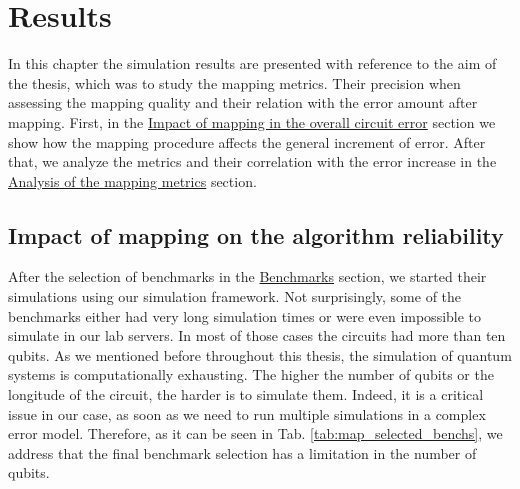 
\chapter{Results}
\label{sec:org82a161d}

In this chapter the simulation results are presented with reference to the aim of the thesis, which was to study the mapping metrics.
Their precision when assessing the mapping quality and their relation with the error amount after mapping.
First, in the \hyperref[sec:org28dbcca]{Impact of mapping in the overall circuit error} section we show how the mapping procedure affects the general increment of error.
After that, we analyze the metrics and their correlation with the error increase in the \hyperref[sec:org2c64a48]{Analysis of the mapping metrics} section.

\section{Impact of mapping on the algorithm reliability}
\label{sec:org28dbcca}
After the selection of benchmarks in the \href{chapter-4.org}{Benchmarks} section, we started their simulations using our simulation framework.
Not surprisingly, some of the benchmarks either had very long simulation times or were even impossible to simulate in our lab servers. In most of those cases the circuits had more than ten qubits.
As we mentioned before throughout this thesis, the simulation of quantum systems is computationally exhausting.
The higher the number of qubits or the longitude of the circuit, the harder is to simulate them.
Indeed, it is a critical issue in our case, as soon as we need to run multiple simulations in a complex error model.
Therefore, as it can be seen in Tab. \ref{tab:map_selected_benchs}, we address that the final benchmark selection has a limitation in the number of qubits.

